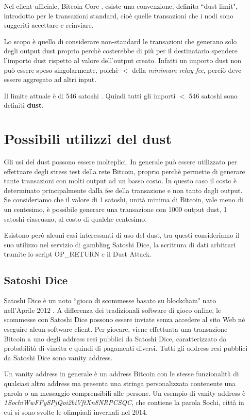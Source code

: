 Nel client ufficiale, Bitcoin Core \cite{btccore}, esiste una convenzione, definita ``dust limit", introdotto per le transazioni standard, cioè quelle transazioni che i nodi sono suggeriti accettare e reinviare.

Lo scopo è quello di considerare non-standard le transazioni che generano solo degli output dust proprio perchè costerebbe di più per il destinatario spendere l'importo dust rispetto al valore dell'output creato. Infatti un importo dust non può essere speso singolarmente, poichè $<$ della \textit{minimum relay fee}, perciò deve essere aggregato ad altri input.

Il limite attuale è di 546 satoshi \cite{BtcDev}. Quindi tutti gli importi $<$ 546 satoshi sono definiti \textbf{dust}.
\section{Possibili utilizzi del dust}
Gli usi del dust possono essere molteplici. In generale può essere utilizzato per effettuare degli stress test della rete Bitcoin, proprio perchè permette di generare tante transazioni con molti output ad un basso costo. In questo caso il costo è determinato principalmente dalla fee della transazione e non tanto dagli output. Se consideriamo che il valore di 1 satoshi, unità minima di Bitcoin, vale meno di un centesimo, è possibile generare una transazione con 1000 output dust, 1 satoshi ciascusno, al costo di qualche centesimo.

Esistono però alcuni casi interessanti di uso del dust, tra questi consideriamo il suo utilizzo nel servizio di gambling Satoshi Dice, la scrittura di dati arbitrari tramite lo script OP\_RETURN e il Dust Attack.
\subsection{Satoshi Dice}
Satoshi Dice è un noto ``gioco di scommesse basato su blockchain" nato nell'Aprile 2012 \cite{SD}. A differenza dei tradizionali software di gioco online, le scommesse con Satoshi Dice possono essere inviate senza accedere al sito Web né eseguire alcun software client. Per giocare, viene effettuata una transazione Bitcoin a uno degli address resi pubblici da Satoshi Dice, caratterizzato da probabilità di vincita e quindi di pagamenti diversi. Tutti gli address resi pubblici da Satoshi Dice sono vanity address.

Un vanity address in generale è un address Bitcoin con le stesse funzionalità di qualsiasi altro address ma presenta una stringa personalizzata contenente una parola o un messaggio comprensibili alle persone. Un esempio di vanity address è \textit{1SochiWwFFySPjQoi2biVftXn8NRPCSQC}, che contiene la parola Sochi, città in cui si sono svolte le olimpiadi invernali nel 2014. 

